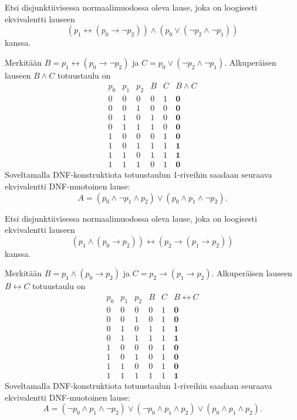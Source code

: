 \documentclass[11pt,a4paper]{amsart}
\begin{document}
\begin{exercise}
Etsi disjunktiivisessa normaalimuodossa oleva lause, joka on loogisesti
ekvivalentti lauseen
\[
(p_1 \leftrightarrow (p_0 \rightarrow \neg p_2))
\land (p_0 \lor (\neg p_2 \land \neg p_1))
\]
kanssa.
\end{exercise}

\begin{solution}
Merkitään \(B = p_1 \leftrightarrow (p_0 \rightarrow \neg p_2)\) ja
\(C = p_0 \lor (\neg p_2 \land \neg p_1)\). Alkuperäisen lauseen
\(B \land C\) totuustaulu on
\[
\begin{array}{ccc|cc|c}
p_0 & p_1 & p_2 & B & C & B \land C \\
\hline
0 & 0 & 0 & 0 & 1 & \mathbf{0} \\
0 & 0 & 1 & 0 & 0 & \mathbf{0} \\
0 & 1 & 0 & 1 & 0 & \mathbf{0} \\
0 & 1 & 1 & 1 & 0 & \mathbf{0} \\
1 & 0 & 0 & 0 & 1 & \mathbf{0} \\
1 & 0 & 1 & 1 & 1 & \mathbf{1} \\
1 & 1 & 0 & 1 & 1 & \mathbf{1} \\
1 & 1 & 1 & 0 & 1 & \mathbf{0}
\end{array}
\]
Soveltamalla DNF-konstruktiota totuustaulun 1-riveihin saadaan seuraava
ekvivalentti DNF-muotoinen lause:
\[
A = (p_0 \land \neg p_1 \land p_2) \lor (p_0 \land p_1 \land \neg p_2).
\]
\end{solution}

\begin{exercise}
Etsi disjunktiivisessa normaalimuodossa oleva lause, joka on loogisesti
ekvivalentti lauseen
\[
(p_1 \land (p_0 \rightarrow p_2))
\leftrightarrow (p_2 \rightarrow (p_1 \rightarrow p_2))
\]
kanssa.
\end{exercise}

\begin{solution}
Merkitään \(B = p_1 \land (p_0 \rightarrow p_2)\) ja
\(C = p_2 \rightarrow (p_1 \rightarrow p_2)\). Alkuperäisen lauseen
\(B \leftrightarrow C\) totuustaulu on
\[
\begin{array}{ccc|cc|c}
p_0 & p_1 & p_2 & B & C & B \leftrightarrow C \\
\hline
0 & 0 & 0 & 0 & 1 & \mathbf{0} \\
0 & 0 & 1 & 0 & 1 & \mathbf{0} \\
0 & 1 & 0 & 1 & 1 & \mathbf{1} \\
0 & 1 & 1 & 1 & 1 & \mathbf{1} \\
1 & 0 & 0 & 0 & 1 & \mathbf{0} \\
1 & 0 & 1 & 0 & 1 & \mathbf{0} \\
1 & 1 & 0 & 0 & 1 & \mathbf{0} \\
1 & 1 & 1 & 1 & 1 & \mathbf{1}
\end{array}
\]
Soveltamalla DNF-konstruktiota totuustaulun 1-riveihin saadaan seuraava
ekvivalentti DNF-muotoinen lause:
\[
A = (\neg p_0 \land p_1 \land \neg p_2) \lor (\neg p_0 \land p_1 \land p_2)
\lor (p_0 \land p_1 \land p_2).
\]
\end{solution}
\end{document}
